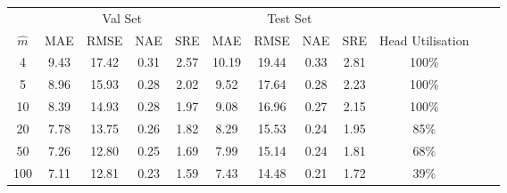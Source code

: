 \begin{tabular}{cccccccccccc} 
 \toprule
 & \multicolumn{4}{c}{Val Set} & \multicolumn{4}{c}{Test Set} & \\
 \cmidrule(r){2-5} \cmidrule(r){6-9}

$\hat{m}$ & MAE & RMSE & NAE & SRE & MAE & RMSE & NAE & SRE & Head Utilisation\\ 
\midrule
4 & 9.43 & 17.42 & 0.31 & 2.57 & 10.19 & 19.44 & 0.33 & 2.81 & 100\% \\ 
5 & 8.96 & 15.93 & 0.28 & 2.02 & 9.52 & 17.64 & 0.28 & 2.23 & 100\% \\ 
10 & 8.39 & 14.93 & 0.28 & 1.97 &  9.08 & 16.96 & 0.27 & 2.15 &  100\%\\
20 & 7.78 & 13.75 & 0.26 & 1.82 &  8.29 & 15.53 & 0.24 &  1.95 & 85\%\\ 
50 & 7.26 & 12.80 & 0.25 & 1.69 & 7.99 & 15.14 & 0.24 & 1.81 & 68\%\\ 
100 & 7.11 & 12.81 & 0.23 & 1.59 & 7.43 & 14.48 & 0.21 & 1.72 & 39\%\\ 
 \bottomrule
\end{tabular}